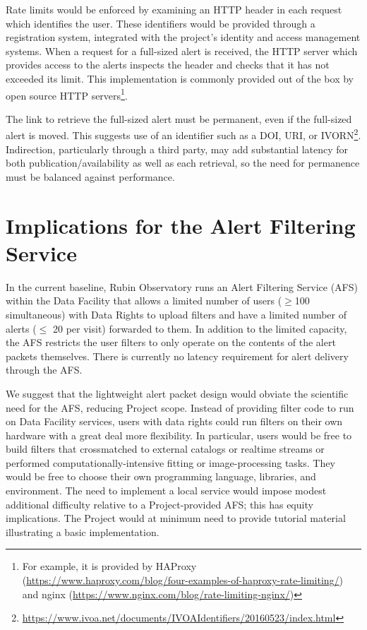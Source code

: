\documentclass[DM,authoryear,toc]{lsstdoc}
\begin{document}
Rate limits would be enforced by examining an HTTP header in each request which identifies the user.
These identifiers would be provided through a registration system, integrated with the project's identity and access management systems.
When a request for a full-sized alert is received, the HTTP server which provides access to the alerts inspects the header and checks that it has not exceeded its limit.
This implementation is commonly provided out of the box by open source HTTP servers\footnote{For example, it is provided by HAProxy (\url{https://www.haproxy.com/blog/four-examples-of-haproxy-rate-limiting/}) and nginx (\url{https://www.nginx.com/blog/rate-limiting-nginx/})}.

The link to retrieve the full-sized alert must be permanent, even if the full-sized alert is moved.
This suggests use of an identifier such as a DOI, URI, or IVORN\footnote{\url{https://www.ivoa.net/documents/IVOAIdentifiers/20160523/index.html}}.
Indirection, particularly through a third party, may add substantial latency for both publication/availability as well as each retrieval, so the need for permanence must be balanced against performance.

\section{Implications for the Alert Filtering Service} \label{sec:alertfiltering}

In the current baseline, Rubin Observatory runs an Alert Filtering Service (AFS) within the Data Facility that allows a limited number of users ($\geq$100 simultaneous) with Data Rights to upload filters and have a limited number of alerts ($\leq$ 20 per visit) forwarded to them.
In addition to the limited capacity, the AFS restricts the user filters to only operate on the contents of the alert packets themselves.
There is currently no latency requirement for alert delivery through the AFS.

We suggest that the lightweight alert packet design would obviate the scientific need for the AFS, reducing Project scope.
Instead of providing filter code to run on Data Facility services, users with data rights could run filters on their own hardware with a great deal more flexibility.
In particular, users would be free to build filters that crossmatched to external catalogs or realtime streams or performed computationally-intensive fitting or image-processing tasks.
They would be free to choose their own programming language, libraries, and environment.
The need to implement a local service would impose modest additional difficulty relative to a Project-provided AFS; this has equity implications.
The Project would at minimum need to provide tutorial material illustrating a basic implementation.
\end{document}
